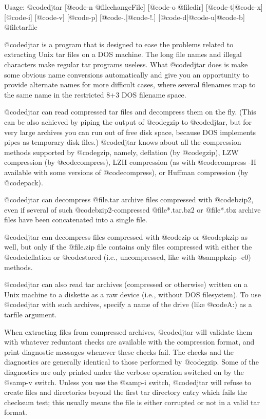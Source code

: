 Usage: @code{djtar} [@code{-n} @file{changeFile}] [@code{-o} @file{dir}]
[@code{-t}|@code{-x}] [@code{-i}] [@code{-v}] [@code{-p}]
[@code{-.}|@code{-!.}] [@code{-d}|@code{-u}|@code{-b}] @file{tarfile}

@code{djtar} is a program that is designed to ease the problems related
to extracting Unix tar files on a DOS machine.  The long file names and
illegal characters make regular tar programs useless.  What @code{djtar}
does is make some obvious name conversions automatically and give you an
opportunity to provide alternate names for more difficult cases, where
several filenames map to the same name in the restricted 8+3 DOS filename
space.

@code{djtar} can read compressed tar files and decompress them on the
fly.  (This can be also achieved by piping the output of @code{gzip} to
@code{djtar}, but for very large archives you can run out of free disk
space, because DOS implements pipes as temporary disk files.)
@code{djtar} knows about all the compression methods supported by
@code{gzip}, namely, deflation (by @code{gzip}), LZW compression
(by @code{compress}), LZH compression (as with @code{compress -H}
available with some versions of @code{compress}), or Huffman compression
(by @code{pack}).

@code{djtar} can decompress @file{.tar} archive files compressed with
@code{bzip2}, even if several of such @code{bzip2}-compressed
@file{*.tar.bz2} or @file{*.tbz} archive files have been concatenated
into a single file.

@code{djtar} can decompress files compressed with @code{zip} or
@code{pkzip} as well, but only if the @file{.zip} file contains only
files compressed with either the @code{deflation} or @code{stored}
(i.e., uncompressed, like with @samp{pkzip -e0}) methods.

@code{djtar} can also read tar archives (compressed or otherwise) written
on a Unix machine to a diskette as a raw device (i.e., without DOS
filesystem).  To use @code{djtar} with such archives, specify a name
of the drive (like @code{A:}) as a tarfile argument.

When extracting files from compressed archives, @code{djtar} will
validate them with whatever reduntant checks are available with the
compression format, and print diagnostic messages whenever these checks
fail.  The checks and the diagnostics are generally identical to those
performed by @code{gzip}.  Some of the diagnostics are only printed under
the verbose operation switched on by the @samp{-v} switch.  Unless you use
the @samp{-i} switch, @code{djtar} will refuse to create files and
directories beyond the first tar directory entry which fails the checksum
test; this usually means the file is either corrupted or not in a valid
tar format.


